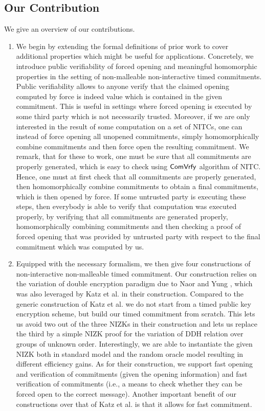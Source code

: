 \subsection{Our Contribution}
We give an overview of our contributions. 
\begin{enumerate}
\item We begin by extending the formal definitions of prior work to cover additional properties which might be useful for applications. Concretely, we introduce public verifiability of forced opening and meaningful homomorphic properties in the setting of non-malleable non-interactive timed commitments. Public verifiability allows to anyone verify that the claimed opening computed by force is indeed value which is contained in the given commitment. This is useful in settings where forced opening is executed by some third party which is not necessarily trusted. Moreover, if we are only interested in the result of some computation on a set of NITCs, one can instead of force opening all unopened commitments, simply homomorphically combine commitments and then force open the resulting commitment. We remark, that for these to work, one must be sure that all commitments are properly generated, which is easy to check using $\mathsf{ComVrfy}$ algorithm of NITC. Hence, one must at first check that all commitments are properly generated, then homomorphically combine commitments to obtain a final commitments, which is then opened by force. If some untrusted party is executing these steps, then everybody is able to verify that computation was executed properly, by verifying that all commitments are generated properly, homomorphically combining commitments and then checking a proof of forced opening that was provided by untrusted party with respect to the final commitment which was computed by us. 
\item Equipped with the necessary formalism, we then give four constructions of non-interactive non-malleable timed commitment. Our construction relies on the variation of double encryption paradigm due to Naor and Yung \cite{STOC:NaoYun90}, which was also leveraged by Katz et al. in their construction. Compared to the generic construction of Katz et al. we do not start from a timed public key encryption scheme, but build our timed commitment from scratch. This lets us avoid two out of the three NIZKs in their construction and lets us replace the third by a simple NIZK proof for the variation of DDH relation over groups of unknown order. Interestingly, we are able to instantiate the given NIZK both in standard model and the random oracle model resulting in different efficiency gains. As for their construction, we support fast opening and verification of commitments (given the opening information) and fast verification of commitments (i.e., a means to check whether they can be forced open to the correct message). Another important benefit of our constructions over that of Katz et al. is that it allows for fast commitment. 

\end{enumerate}

